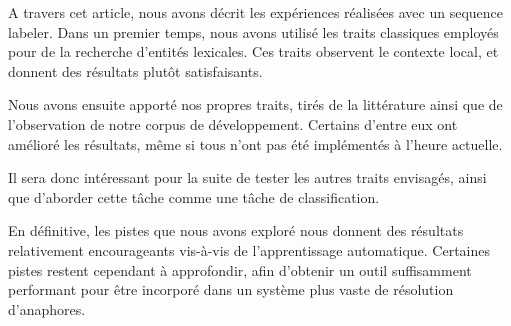 \documentclass[a4paper,12pt]{article}
\begin{document}
A travers cet article, nous avons décrit les expériences réalisées avec un sequence labeler. Dans un premier temps, nous avons utilisé les traits classiques employés pour de la recherche d'entités lexicales. Ces traits observent le contexte local, et donnent des résultats plutôt satisfaisants.

Nous avons ensuite apporté nos propres traits, tirés de la littérature ainsi que de l'observation de notre corpus de développement. Certains d'entre eux ont amélioré les résultats, même si tous n'ont pas été implémentés à l'heure actuelle.

Il sera donc intéressant pour la suite de tester les autres traits envisagés, ainsi que d'aborder cette tâche comme une tâche de classification.

En définitive, les pistes que nous avons exploré nous donnent des résultats relativement encourageants vis-à-vis de l'apprentissage automatique. Certaines pistes restent cependant à approfondir, afin d'obtenir un outil suffisamment performant pour être incorporé dans un système plus vaste de résolution d'anaphores.



\end{document}
